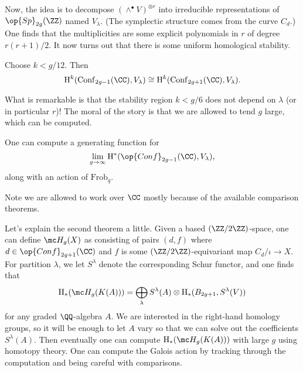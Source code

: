 \documentclass{article}
\begin{document}
Now, the idea is to decompose $(\land^\bullet V)^{\otimes r}$ into irreducible representations of $\op{Sp}_{2g}(\ZZ)$ named $V_\lambda$. (The symplectic structure comes from the curve $C_d$.) One finds that the multiplicities are some explicit polynomials in $r$ of degree $r(r+1)/2$. It now turns out that there is some uniform homological stability.
\begin{theorem}
	Choose $k<g/12$. Then
	\[\mathrm H^k(\mathrm{Conf}_{2g-1}(\CC),V_\lambda)\cong\mathrm H^k(\mathrm{Conf}_{2g+1}(\CC),V_\lambda).\]
\end{theorem}
What is remarkable is that the stability region $k<g/6$ does not depend on $\lambda$ (or in particular $r$)! The moral of the story is that we are allowed to tend $g$ large, which can be computed.
\begin{theorem}
	One can compute a generating function for
	\[\lim_{g\to\infty}\mathrm H^*(\op{Conf}_{2g-1}(\CC),V_\lambda),\]
	along with an action of $\mathrm{Frob}_q$.
\end{theorem}
Note we are allowed to work over $\CC$ mostly because of the available comparison theorems.

Let's explain the second theorem a little. Given a based $(\ZZ/2\ZZ)$-space, one can define $\mc H_g(X)$ as consisting of pairs $(d,f)$ where $d\in\op{Conf}_{2g+1}(\CC)$ and $f$ is some $(\ZZ/2\ZZ)$-equivariant map $C_d/\iota\to X$. For partition $\lambda$, we let $S^\lambda$ denote the corresponding Schur functor, and one finds that
\[\mathrm H_*(\mc H_g(K(A)))=\bigoplus_\lambda S^\lambda(A)\otimes\mathrm H_*(B_{2g+1},S^\lambda(V))\]
for any graded $\QQ$-algebra $A$. We are interested in the right-hand homology groups, so it will be enough to let $A$ vary so that we can solve out the coefficients $S^\lambda(A)$. Then eventually one can compute $\mathrm H_*(\mc H_g(K(A)))$ with large $g$ using homotopy theory. One can compute the Galois action by tracking through the computation and being careful with comparisons.
\end{document}
